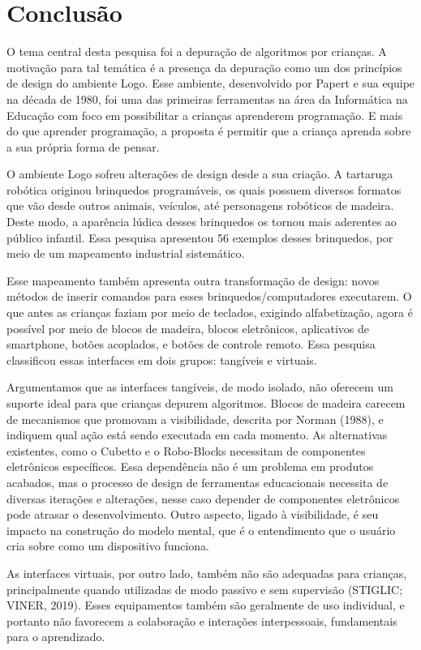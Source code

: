 \chapter{Conclusão}
\label{c_conclusao}

O tema central desta pesquisa foi a depuração de algoritmos por crianças. A motivação para tal temática é a presença da depuração como um dos princípios de design do ambiente Logo. Esse ambiente, desenvolvido por Papert e sua equipe na década de 1980, foi uma das primeiras ferramentas na área da Informática na Educação com foco em possibilitar a crianças aprenderem programação. E mais do que aprender programação, a proposta é permitir que a criança aprenda sobre a sua própria forma de pensar. 

O ambiente Logo sofreu alterações de design desde a sua criação. A tartaruga robótica originou brinquedos programáveis, os quais possuem diversos formatos que vão desde outros animais, veículos, até personagens robóticos de madeira. Deste modo, a aparência lúdica desses brinquedos os tornou mais aderentes ao público infantil. Essa pesquisa apresentou 56 exemplos desses brinquedos, por meio de um mapeamento industrial sistemático. 

Esse mapeamento também apresenta outra transformação de design: novos métodos de inserir comandos para esses brinquedos/computadores executarem. O que antes as crianças faziam por meio de teclados, exigindo alfabetização, agora é possível por meio de blocos de madeira, blocos eletrônicos, aplicativos de smartphone, botões acoplados, e botões de controle remoto. Essa pesquisa classificou essas interfaces em dois grupos: tangíveis e virtuais.

Argumentamos que as interfaces tangíveis, de modo isolado, não oferecem um suporte ideal para que crianças depurem algoritmos. Blocos de madeira carecem de mecanismos que promovam a visibilidade, descrita por Norman (1988), e indiquem qual ação está sendo executada em cada momento. As alternativas existentes, como o Cubetto e o Robo-Blocks necessitam de componentes eletrônicos específicos. Essa dependência não é um problema em produtos acabados, mas o processo de design de ferramentas educacionais necessita de diversas iterações e alterações, nesse caso depender de componentes eletrônicos pode atrasar o desenvolvimento. Outro aspecto, ligado à visibilidade, é seu impacto na construção do modelo mental, que é o entendimento que o usuário cria sobre como um dispositivo funciona. 

As interfaces virtuais, por outro lado, também não são adequadas para crianças, principalmente quando utilizadas de modo passivo e sem supervisão (STIGLIC; VINER, 2019). Esses equipamentos também são geralmente de uso individual, e portanto não favorecem a colaboração e interações interpessoais, fundamentais para o aprendizado.

